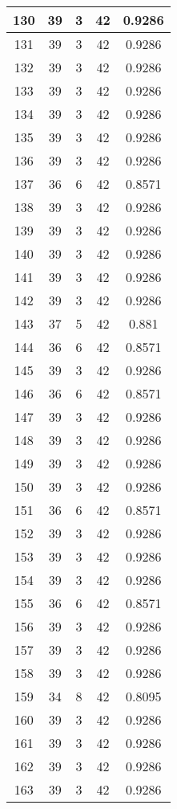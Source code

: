 \documentclass[letterpaper, 12pt]{article}
\begin{document}
\begin{longtable}{|c|c|c|c|c|}
\hline
130 & 39 & 3 & 42 & 0.9286 \\
\hline
131 & 39 & 3 & 42 & 0.9286 \\
\hline
132 & 39 & 3 & 42 & 0.9286 \\
\hline
133 & 39 & 3 & 42 & 0.9286 \\
\hline
134 & 39 & 3 & 42 & 0.9286 \\
\hline
135 & 39 & 3 & 42 & 0.9286 \\
\hline
136 & 39 & 3 & 42 & 0.9286 \\
\hline
137 & 36 & 6 & 42 & 0.8571 \\
\hline
138 & 39 & 3 & 42 & 0.9286 \\
\hline
139 & 39 & 3 & 42 & 0.9286 \\
\hline
140 & 39 & 3 & 42 & 0.9286 \\
\hline
141 & 39 & 3 & 42 & 0.9286 \\
\hline
142 & 39 & 3 & 42 & 0.9286 \\
\hline
143 & 37 & 5 & 42 & 0.881 \\
\hline
144 & 36 & 6 & 42 & 0.8571 \\
\hline
145 & 39 & 3 & 42 & 0.9286 \\
\hline
146 & 36 & 6 & 42 & 0.8571 \\
\hline
147 & 39 & 3 & 42 & 0.9286 \\
\hline
148 & 39 & 3 & 42 & 0.9286 \\
\hline
149 & 39 & 3 & 42 & 0.9286 \\
\hline
150 & 39 & 3 & 42 & 0.9286 \\
\hline
151 & 36 & 6 & 42 & 0.8571 \\
\hline
152 & 39 & 3 & 42 & 0.9286 \\
\hline
153 & 39 & 3 & 42 & 0.9286 \\
\hline
154 & 39 & 3 & 42 & 0.9286 \\
\hline
155 & 36 & 6 & 42 & 0.8571 \\
\hline
156 & 39 & 3 & 42 & 0.9286 \\
\hline
157 & 39 & 3 & 42 & 0.9286 \\
\hline
158 & 39 & 3 & 42 & 0.9286 \\
\hline
159 & 34 & 8 & 42 & 0.8095 \\
\hline
160 & 39 & 3 & 42 & 0.9286 \\
\hline
161 & 39 & 3 & 42 & 0.9286 \\
\hline
162 & 39 & 3 & 42 & 0.9286 \\
\hline
163 & 39 & 3 & 42 & 0.9286 \\

\end{longtable}
\end{document}
